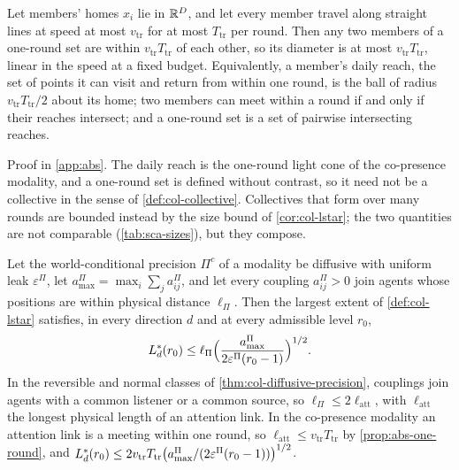 \begin{proposition}\label{prop:abs-one-round}
Let members' homes $x_i$ lie in $\mathbb{R}^D$, and let every member travel along straight lines at speed at most $v_{\mathrm{tr}}$ for at most $T_{\mathrm{tr}}$ per round. Then any two members of a one-round set are within $v_{\mathrm{tr}}T_{\mathrm{tr}}$ of each other, so its diameter is at most $v_{\mathrm{tr}}T_{\mathrm{tr}}$, linear in the speed at a fixed budget. Equivalently, a member's daily reach, the set of points it can visit and return from within one round, is the ball of radius $v_{\mathrm{tr}}T_{\mathrm{tr}}/2$ about its home; two members can meet within a round if and only if their reaches intersect; and a one-round set is a set of pairwise intersecting reaches.
\end{proposition}

Proof in \cref{app:abs}. The daily reach is the one-round light cone of the co-presence modality, and a one-round set is defined without contrast, so it need not be a collective in the sense of \cref{def:col-collective}. Collectives that form over many rounds are bounded instead by the size bound of \cref{cor:col-lstar}; the two quantities are not comparable (\cref{tab:sca-sizes}), but they compose.

\begin{corollary}\label{cor:abs-one-round-extent}
Let the world-conditional precision $\Pi^c$ of a modality be diffusive with uniform leak $\varepsilon^\Pi$, let $a^\Pi_{\max}=\max_i\sum_ja^\Pi_{ij}$, and let every coupling $a^\Pi_{ij}>0$ join agents whose positions are within physical distance $\ell_\Pi$. Then the largest extent of \cref{def:col-lstar} satisfies, in every direction $d$ and at every admissible level $r_0$,
\[
L^{\ast}_d(r_0)\le\ell_\Pi\Bigl(\frac{a^\Pi_{\max}}{2\varepsilon^\Pi(r_0-1)}\Bigr)^{1/2}.
\]
In the reversible and normal classes of \cref{thm:col-diffusive-precision}, couplings join agents with a common listener or a common source, so $\ell_\Pi\le2\ell_{\mathrm{att}}$, with $\ell_{\mathrm{att}}$ the longest physical length of an attention link. In the co-presence modality an attention link is a meeting within one round, so $\ell_{\mathrm{att}}\le v_{\mathrm{tr}}T_{\mathrm{tr}}$ by \cref{prop:abs-one-round}, and $L^{\ast}_d(r_0)\le2v_{\mathrm{tr}}T_{\mathrm{tr}}\bigl(a^\Pi_{\max}/(2\varepsilon^\Pi(r_0-1))\bigr)^{1/2}$.
\end{corollary}

